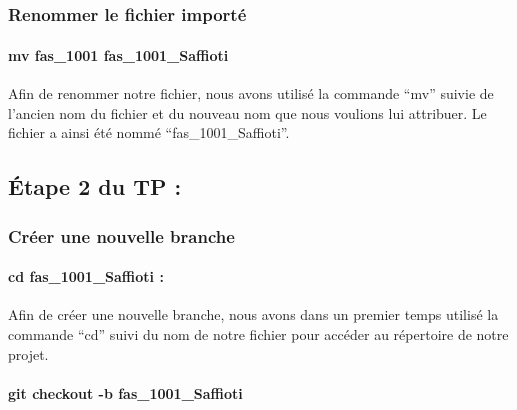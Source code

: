 \documentclass[
  letterpaper,
  DIV=11,
  numbers=noendperiod]{scrartcl}
\let\oldparagraph\paragraph
\renewcommand{\paragraph}[1]{\oldparagraph{#1}\mbox{}}
\begin{document}
\hypertarget{section}{%
\subsection{}\label{section}}

\hypertarget{renommer-le-fichier-importuxe9}{%
\subsubsection{Renommer le fichier
importé}\label{renommer-le-fichier-importuxe9}}

\hypertarget{mv-fas_1001-fas_1001_saffioti}{%
\paragraph{mv fas\_1001
fas\_1001\_Saffioti}\label{mv-fas_1001-fas_1001_saffioti}}

Afin de renommer notre fichier, nous avons utilisé la commande ``mv''
suivie de l'ancien nom du fichier et du nouveau nom que nous voulions
lui attribuer. Le fichier a ainsi été nommé ``fas\_1001\_Saffioti''.

\hypertarget{uxe9tape-2-du-tp}{%
\subsection{Étape 2 du TP :}\label{uxe9tape-2-du-tp}}

\hypertarget{cruxe9er-une-nouvelle-branche}{%
\subsubsection{Créer une nouvelle
branche}\label{cruxe9er-une-nouvelle-branche}}

\hypertarget{cd-fas_1001_saffioti}{%
\paragraph{cd fas\_1001\_Saffioti :}\label{cd-fas_1001_saffioti}}

Afin de créer une nouvelle branche, nous avons dans un premier temps
utilisé la commande ``cd'' suivi du nom de notre fichier pour accéder au
répertoire de notre projet.

\hypertarget{git-checkout--b-fas_1001_saffioti}{%
\paragraph{git checkout -b
fas\_1001\_Saffioti}\label{git-checkout--b-fas_1001_saffioti}}
\end{document}
